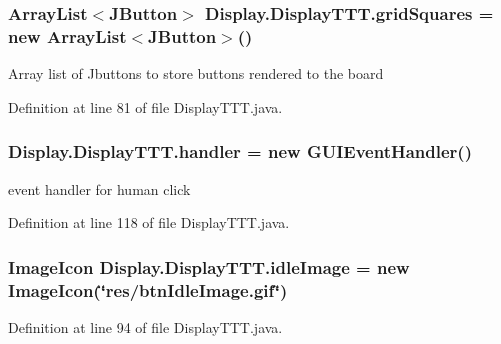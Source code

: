 \subsubsection[{grid\+Squares}]{\setlength{\rightskip}{0pt plus 5cm}Array\+List$<$J\+Button$>$ Display.\+Display\+T\+T\+T.\+grid\+Squares = new Array\+List$<$J\+Button$>$()\hspace{0.3cm}{\ttfamily [private]}}\label{class_display_1_1_display_t_t_t_af2ce89b88ce5f8ccae426f4f273d52aa}
Array list of Jbuttons to store buttons rendered to the board 

Definition at line 81 of file Display\+T\+T\+T.\+java.

\hypertarget{class_display_1_1_display_t_t_t_a834294acca3e75ec3d75e52ecd6028bc}{}
\subsubsection[{handler}]{ Display.\+Display\+T\+T\+T.\+handler = new {\bf G\+U\+I\+Event\+Handler}()\hspace{0.3cm}{\ttfamily [private]}}\label{class_display_1_1_display_t_t_t_a834294acca3e75ec3d75e52ecd6028bc}
event handler for human click 

Definition at line 118 of file Display\+T\+T\+T.\+java.

\hypertarget{class_display_1_1_display_t_t_t_a9f22db838fa2492c00c8466efb8eebd5}{}
\subsubsection[{idle\+Image}]{\setlength{\rightskip}{0pt plus 5cm}Image\+Icon Display.\+Display\+T\+T\+T.\+idle\+Image = new Image\+Icon(\char`\"{}res/btn\+Idle\+Image.\+gif\char`\"{})\hspace{0.3cm}{\ttfamily [private]}}\label{class_display_1_1_display_t_t_t_a9f22db838fa2492c00c8466efb8eebd5}


Definition at line 94 of file Display\+T\+T\+T.\+java.

\hypertarget{class_display_1_1_display_t_t_t_a713fdaab41d88af675c9f54dfcdb87a2}{}
